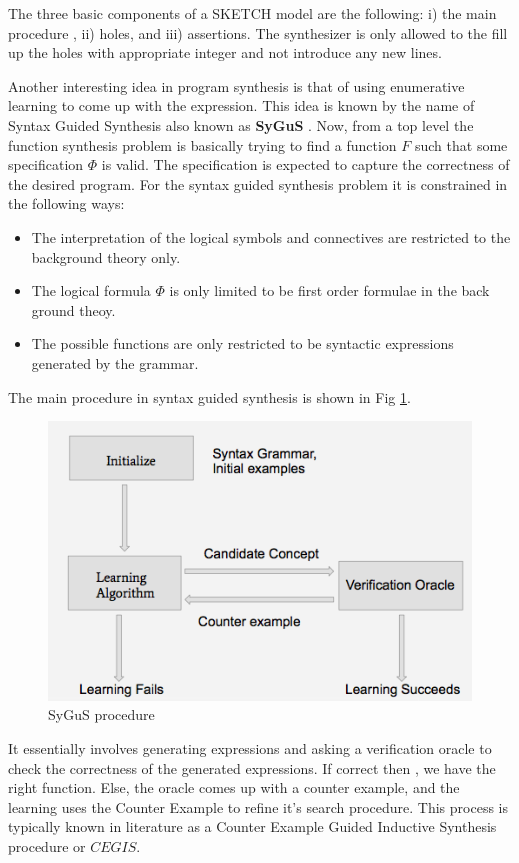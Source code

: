 \documentclass{article}
\begin{document}
The three basic components of a SKETCH model are the following: i) the main
procedure , ii) holes, and iii) assertions.  The synthesizer is only allowed to
the fill up the holes with appropriate integer and not introduce any new lines. 

Another interesting idea in program synthesis is that of using enumerative
learning to come up with the expression. This idea is known by the name of
Syntax Guided Synthesis also known as \textbf{SyGuS} \cite{sygus}. Now, from a
top level the function synthesis problem is basically trying to find a function
$F$ such that some specification $\Phi$ is valid. The specification is expected
to capture the correctness of the desired program. For the syntax guided
synthesis problem it is constrained in the following ways:

\begin{itemize}
    \item The interpretation of the logical symbols and connectives
	are restricted to the background theory only.
    \item The logical formula $\Phi$ is only limited to be first order formulae in
	the back ground theoy.
    \item The possible functions are only restricted to be syntactic expressions
	generated by the grammar.
\end{itemize}

The main procedure in syntax guided synthesis is shown in Fig \ref{sygus_fig}.  
\begin{figure}
\label{sygus_fig}
\includegraphics[scale = 0.8]{workflow.png}
\caption{SyGuS procedure \cite{sygus}}
\end{figure}

It essentially involves generating expressions and asking a verification oracle
to check the correctness of the generated expressions. If correct then , we
have the right function. Else, the oracle comes up with a counter example, and
the learning uses the Counter Example to refine it's search procedure. This
process is typically known in literature as a Counter Example Guided Inductive
Synthesis procedure or $CEGIS$.
\end{document}
